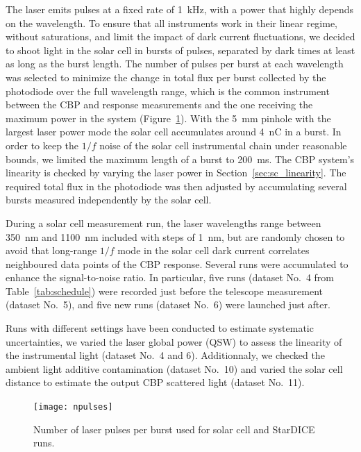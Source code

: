 The laser emits pulses at a fixed rate of \SI{1}{\kilo\hertz}, with a power that highly depends on the wavelength. To ensure that all instruments work in their linear regime, without saturations, and limit the impact of dark current fluctuations, we decided to shoot light in the solar cell in bursts of pulses, separated by dark times at least as long as the burst length. The number of pulses per burst at each wavelength was selected to minimize the change in total flux per burst collected by the photodiode over the full wavelength range, which is the common instrument between the CBP and \SD response measurements and the one receiving the maximum power in the system (Figure~\ref{fig:npulses}). With the \SI{5}{\mm} pinhole with the largest laser power mode the solar cell accumulates around \SI{4}{\nano\coulomb} in a burst. In order to keep the $1/f$ noise of the solar cell instrumental chain under reasonable bounds, we limited the maximum length of a burst to \SI{200}{\ms}. The CBP system's linearity is checked by varying the laser power in Section~\ref{sec:sc_linearity}.  The required total flux in the photodiode was then adjusted by accumulating several bursts measured independently by the solar cell.

During a solar cell measurement run, the laser wavelengths range between \SI{350}{\nano\meter} and \SI{1100}{\nano\meter} included with steps of \SI{1}{\nm}, but are randomly chosen to avoid that long-range $ 1/f$ mode in the solar cell dark current correlates neighboured data points of the CBP response. Several runs were accumulated to enhance the signal-to-noise ratio. In particular, five runs (dataset No.~4 from Table~\ref{tab:schedule}) were recorded just before the \SD telescope measurement (dataset No.~5), and five new runs (dataset No.~6) were launched just after.

Runs with different settings have been conducted to estimate systematic uncertainties, we varied the laser global power (QSW) to assess the linearity of the instrumental light (dataset No.~4 and 6). Additionnaly, we checked the ambient light additive contamination (dataset No.~10) and varied the solar cell distance to estimate the output CBP scattered light (dataset No.~11).

\begin{figure}[!h]
\centering
\texttt{[image: npulses]}
\caption{Number of laser pulses per burst used for solar cell and StarDICE runs.}\label{fig:npulses}
\end{figure}

